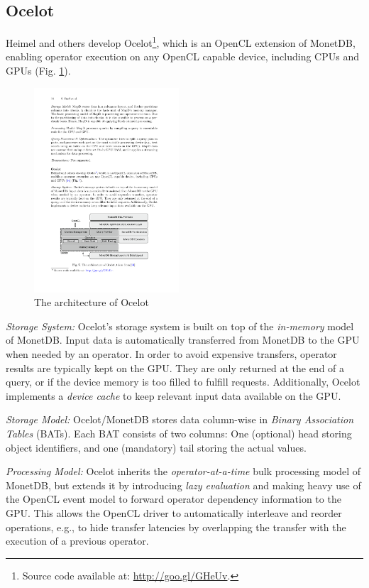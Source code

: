 \documentclass[twocolumn]{article}
\begin{document}
\subsection{Ocelot}
Heimel and others develop Ocelot\footnote{Source code available at: \href{http://goo.gl/GHeUv}{http://goo.gl/GHeUv}.}, which is an OpenCL extension of MonetDB, enabling operator execution on any OpenCL capable device, including CPUs and GPUs \cite{Heimel:2013}(Fig. \ref{fig:ocelot}).
\begin{figure}[htb]
        \centering
        \includegraphics[width=0.48\textwidth]{ocelot.pdf}
        \caption{The architecture of Ocelot}
        \label{fig:ocelot}
\end{figure}

\noindent
\textit{Storage System:} 
Ocelot’s storage system is built on top of the \textit{in-memory} model of MonetDB. Input data is automatically transferred from MonetDB to the GPU when needed by an operator. In order to avoid expensive transfers, operator results are typically kept on the GPU. They are only returned at the end of a query, or if the device memory is too filled to fulfill requests. Additionally, Ocelot implements a \textit{device cache} to keep relevant input data available on the GPU.

\noindent
\textit{Storage Model:} 
Ocelot/MonetDB stores data column-wise in \textit{Binary Association Tables} (BATs). Each BAT consists of two columns: One (optional) head storing object identifiers, and one (mandatory) tail storing the actual values.

\noindent
\textit{Processing Model:} Ocelot inherits the \textit{operator-at-a-time} bulk processing model of MonetDB, but extends it by introducing \textit{lazy evaluation} and making heavy use of the OpenCL event model to forward operator dependency information to the GPU. This allows the OpenCL driver to automatically interleave and reorder operations, e.g., to hide transfer latencies by overlapping the transfer with the execution of a previous operator.
\end{document}
